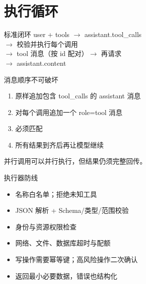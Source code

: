 \documentclass[aspectratio=169,UTF8]{ctexbeamer}
\begin{document}
\section{执行循环}
\begin{frame}{标准闭环}
\centering
user + tools $\rightarrow$ assistant.tool\_calls\\
$\rightarrow$ 校验并执行每个调用\\
$\rightarrow$ tool 消息（按 id 配对）$\rightarrow$ 再请求\\
$\rightarrow$ assistant.content
\end{frame}
\begin{frame}{消息顺序不可破坏}
\begin{enumerate}
  \item 原样追加包含 tool\_calls 的 assistant 消息
  \item 对每个调用追加一个 role=tool 消息
  \item {} 必须匹配
  \item 所有结果到齐后再让模型继续
\end{enumerate}
并行调用可以并行执行，但结果仍须完整回传。
\end{frame}
\begin{frame}{执行器防线}
\begin{itemize}
  \item 名称白名单；拒绝未知工具
  \item JSON 解析 + Schema/类型/范围校验
  \item 身份与资源权限检查
  \item 网络、文件、数据库超时与配额
  \item 写操作需要幂等键；高风险操作二次确认
  \item 返回最小必要数据，错误也结构化
\end{itemize}
\end{frame}
\end{document}
